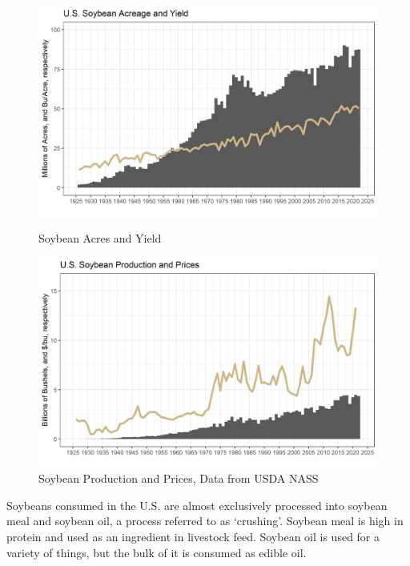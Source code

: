 \documentclass[
  letterpaper,
  DIV=11,
  numbers=noendperiod]{scrreprt}
\begin{document}
\begin{figure}

{\centering 

\href{Soybean\%20Acres\%20and\%20Yield,\%20Data\%20from\%20USDA\%20NASS}{\includegraphics{assets/PrimerforGrain_SoyAcandY.png}}

}

\caption{Soybean Acres and Yield}

\end{figure}

\begin{figure}

{\centering \includegraphics{assets/PrimerforGrain_SoyProdand$.png}

}

\caption{Soybean Production and Prices, Data from USDA NASS}

\end{figure}

Soybeans consumed in the U.S. are almost exclusively processed into
soybean meal and soybean oil, a process referred to as `crushing'.
Soybean meal is high in protein and used as an ingredient in livestock
feed. Soybean oil is used for a variety of things, but the bulk of it is
consumed as edible oil.
\end{document}
